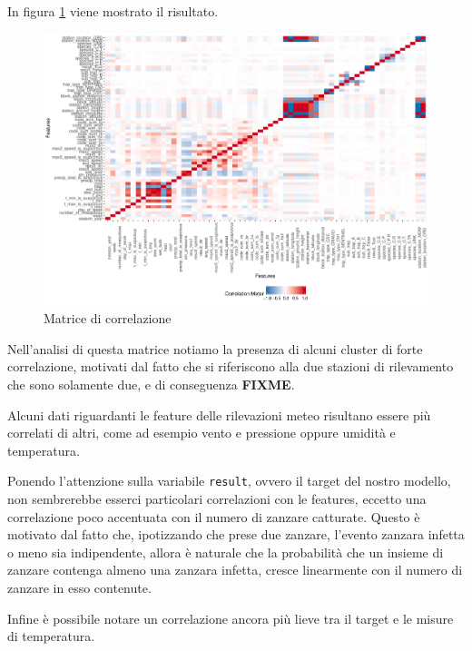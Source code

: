 In figura \ref{fig:plot_correlation} viene mostrato il risultato.

\begin{figure}[htb]
	\centering
	\includegraphics[width=1\columnwidth]{images/ml/plot_correlation}
	\caption{Matrice di correlazione}
	\label{fig:plot_correlation}
\end{figure}

Nell'analisi di questa matrice notiamo la presenza di alcuni cluster di forte 
correlazione, motivati dal fatto che si riferiscono alla due stazioni di 
rilevamento che sono solamente due, e di conseguenza  \textbf{FIXME}.

Alcuni dati riguardanti le feature delle rilevazioni meteo risultano essere più 
correlati di altri, come ad esempio vento e pressione oppure umidità e 
temperatura.

Ponendo l'attenzione sulla variabile \texttt{result}, ovvero il target del 
nostro modello, non sembrerebbe esserci particolari correlazioni con le 
features, eccetto una correlazione poco accentuata con il numero di 
zanzare catturate. Questo è motivato dal fatto che, ipotizzando che prese due 
zanzare, l'evento zanzara infetta o meno sia indipendente, allora è naturale 
che la probabilità che un insieme di zanzare contenga almeno una zanzara 
infetta, cresce linearmente con il numero di zanzare in esso contenute.

Infine è possibile notare un correlazione ancora più lieve tra il target e le 
misure di temperatura. 
